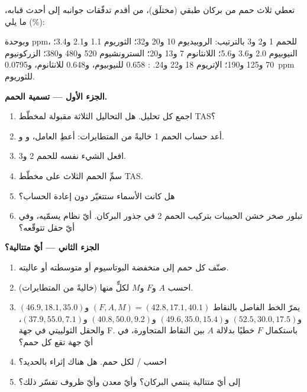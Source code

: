 \begin{problem}
\label{pb:b2:magmatic-series:1}
تعطي ثلاث حمم من بركان طبقي (مختلَق)، من أقدم تدفّقات جوانبه إلى أحدث
قبابه، ما يلي (\unit{\percent}):

\smallskip{}

\smallskip\noindent وبوحدة ppm، للحمم 1 و2 و3 بالترتيب: الروبيديوم 10 و20 و32؛ الثوريوم 1.1 و2.1 و3.4؛ النيوبيوم 2.0 و3.6 و5.6؛
اللانثانوم 7 و13 و20؛ السترونشيوم 520 و480 و380؛ الزركونيوم 70 و125 و190؛ الإتريوم 18 و22 و24. : 0.658
للنيوبيوم، و0.648 للانثانوم، و\qty{0.0795}{ppm} للثوريوم.

\noindent\textbf{الجزء الأول --- تسمية الحمم.}
\begin{enumerate}
\item اجمع كل تحليل. هل التحاليل الثلاثة مقبولة لمخطّط TAS؟
\item أعد حساب الحمم 1 خاليةً من المتطايرات: أعطِ العامل، و
و.
\item افعل الشيء نفسه للحمم 2 و3.
\item سمِّ الحمم الثلاث على مخطّط TAS.
\item هل كانت الأسماء ستتغيّر دون إعادة الحساب؟
\item تبلور صخر خشن الحبيبات بتركيب الحمم 2 في جذور
البركان. أيّ نظام يسمّيه، وفي أيّ حقل تتوقّعه؟
\end{enumerate}

\noindent\textbf{الجزء الثاني --- أيّ متتالية؟}
\begin{enumerate}[resume]
\item صنّف كل حمم إلى منخفضة البوتاسيوم أو متوسطته أو عاليته.
\item احسب $A$ و$F$ و$M$ لكلٍّ منها (خاليةً من المتطايرات).
\item يمرّ الخط الفاصل بالنقاط $(F, A, M) = (42.8, 17.1, 40.1)$ و$(46.9, 18.1,
35.0)$ و$(52.5, 30.0, 17.5)$ و$(49.6, 35.0, 15.4)$ و$(40.8, 50.0, 9.2)$ و$(37.9,
55.0, 7.1)$، والحقل الثولييتي في جهة F. باستكمال $F$ خطيًا بدلالة
$A$ بين النقاط المتجاورة، في أيّ جهة تقع كل حمم؟
\item احسب / لكل حمم. هل هناك إثراء بالحديد؟
\item إلى أيّ متتالية ينتمي البركان؟ وأيّ معدن وأيّ ظروف
تفسّر ذلك؟
\end{enumerate}


\end{problem}
